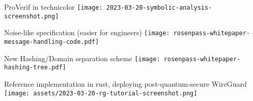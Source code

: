 \begin{frame}{ProVerif in technicolor}
  \texttt{[image: 2023-03-20-symbolic-analysis-screenshot.png]}
\end{frame}


\begin{frame}{Noise-like specification (easier for engineers)}
  \texttt{[image: rosenpass-whitepaper-message-handling-code.pdf]}
\end{frame}

\begin{frame}{New Hashing/Domain separation scheme}
  \texttt{[image: rosenpass-whitepaper-hashing-tree.pdf]}
\end{frame}

\begin{frame}{Reference implementation in rust, deploying post-quantum-secure WireGuard}
  \texttt{[image: assets/2023-03-20-rg-tutorial-screenshot.png]}
\end{frame}
